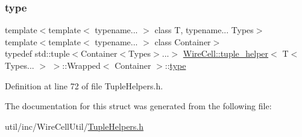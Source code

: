 \subsubsection{\texorpdfstring{type}{type}}
{\footnotesize\ttfamily template$<$template$<$ typename... $>$ class T, typename... Types$>$ \\
template$<$template$<$ typename... $>$ class Container$>$ \\
typedef std\+::tuple$<$Container$<$Types$>$...$>$ \hyperlink{struct_wire_cell_1_1tuple__helper}{Wire\+Cell\+::tuple\+\_\+helper}$<$ T$<$ Types... $>$ $>$\+::Wrapped$<$ Container $>$\+::\hyperlink{struct_wire_cell_1_1tuple__helper_3_01_t_3_01_types_8_8_8_01_4_01_4_1_1_wrapped_a7683cd8d0bef605ad870bea2f1ccd41d}{type}}



Definition at line 72 of file Tuple\+Helpers.\+h.



The documentation for this struct was generated from the following file\+:\begin{DoxyCompactItemize}
\item 
util/inc/\+Wire\+Cell\+Util/\hyperlink{_tuple_helpers_8h}{Tuple\+Helpers.\+h}\end{DoxyCompactItemize}
